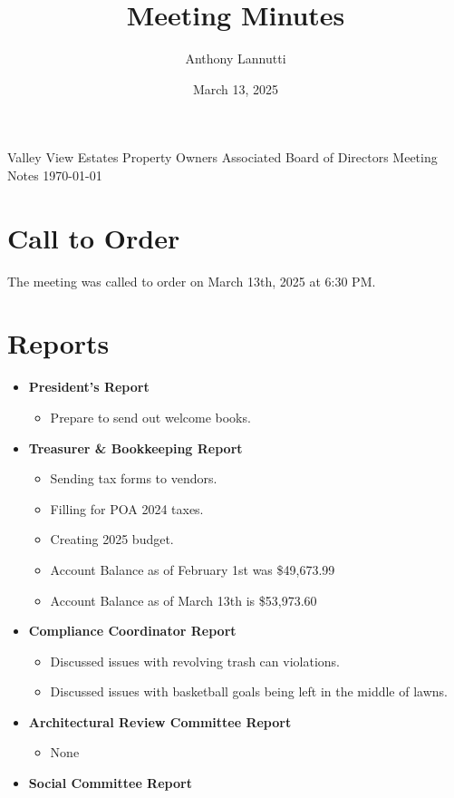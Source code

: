 \documentclass[10pt,a4paper]{article}
\author{Anthony Lannutti}
\date{March 13, 2025}
\title{Meeting Minutes}
\begin{document}
\begin{center}
  Valley View Estates Property Owners Associated Board of Directors Meeting Notes\break{}
  \today{}
\end{center}

\section*{Call to Order}
\begin{flushleft}
The meeting was called to order on March 13th, 2025 at 6:30 PM\@.
\end{flushleft}


\section*{Reports}
\begin{itemize}
  \item \textbf{President's Report}
  \begin{itemize}
    \item Prepare to send out welcome books.
  \end{itemize}
  \item \textbf{Treasurer \& Bookkeeping Report}
  \begin{itemize}
    \item Sending tax forms to vendors.
    \item Filling for POA 2024 taxes.
    \item Creating 2025 budget.
    \item Account Balance as of February 1st was \$49,673.99
    \item Account Balance as of March 13th is \$53,973.60
  \end{itemize}
  \item \textbf{Compliance Coordinator Report}
  \begin{itemize}
    \item Discussed issues with revolving trash can violations.
    \item Discussed issues with basketball goals being left in the middle of lawns.
  \end{itemize}
  \item \textbf{Architectural Review Committee Report}
  \begin{itemize}
    \item None
  \end{itemize}
  \item \textbf{Social Committee Report}
  \begin{itemize}

\end{itemize}
\end{itemize}
\end{document}
